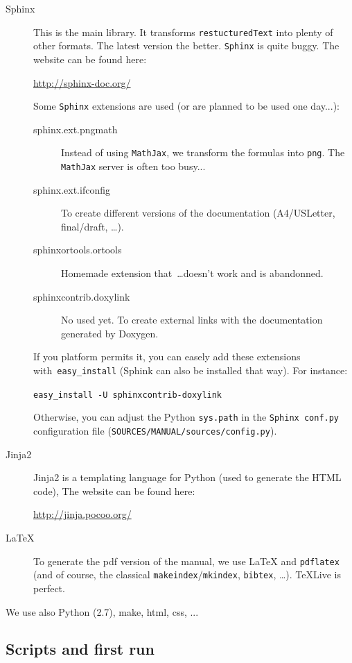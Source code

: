 \documentclass[a4paper,10pt]{article}
\newcommand{\code}[1]{\texttt{#1}}
\begin{document}
\begin{description}
 \item[Sphinx] This is the main library. It transforms \verb+restucturedText+ into plenty of other formats. The latest version the better. \code{Sphinx} is quite buggy. The website can be found here:

\href{http://sphinx-doc.org/}{http://sphinx-doc.org/}

Some \code{Sphinx} extensions are used (or are planned to be used one day...):
 \begin{description}
\item[sphinx.ext.pngmath] Instead of using \code{MathJax}, we transform the formulas into \code{png}. The \code{MathJax} server is often too busy...
\item[sphinx.ext.ifconfig] To create different versions of the documentation (A4/USLetter, final/draft, \ldots).
\item[sphinxortools.ortools] Homemade extension that~\ldots doesn't work and is abandonned.
\item[sphinxcontrib.doxylink] No used yet. To create external links with the documentation generated by Doxygen.
\end{description}

If you platform permits it, you can easely add these extensions with~\code{easy\_install} (Sphink can also be installed that way). For instance:

\code{easy\_install -U sphinxcontrib-doxylink}

Otherwise, you can adjust the Python \code{sys.path} in the \code{Sphinx conf.py} configuration file (\code{SOURCES/MANUAL/sources/config.py}).

 \item[Jinja2] Jinja2 is a templating language for Python (used to generate the HTML code), The website can be found here:

\href{http://jinja.pocoo.org/}{http://jinja.pocoo.org/}

 \item[\LaTeX] To generate the pdf version of the manual, we use \LaTeX{} and \verb+pdflatex+ (and of course, the classical \verb+makeindex+/\verb+mkindex+, \verb+bibtex+, \ldots). \TeX Live is perfect.
 \end{description}

We use also Python (2.7), make, html, css, ...

\subsection{Scripts and first run}
\end{document}
